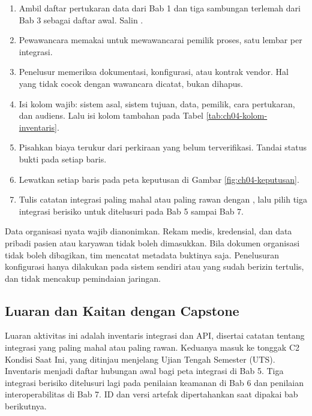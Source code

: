 \begin{enumerate}
  \item Ambil daftar pertukaran data dari Bab 1 dan tiga sambungan terlemah dari Bab 3 sebagai daftar awal.
        Salin .
  \item Pewawancara memakai  untuk mewawancarai
        pemilik proses, satu lembar per integrasi.
  \item Penelusur memeriksa dokumentasi, konfigurasi, atau kontrak vendor. Hal yang tidak cocok dengan wawancara
        dicatat, bukan dihapus.
  \item Isi kolom wajib: sistem asal, sistem tujuan, data, pemilik, cara pertukaran, dan audiens. Lalu isi kolom
        tambahan pada Tabel \ref{tab:ch04-kolom-inventaris}.
  \item Pisahkan biaya terukur dari perkiraan yang belum terverifikasi. Tandai status bukti pada setiap baris.
  \item Lewatkan setiap baris pada peta keputusan di Gambar \ref{fig:ch04-keputusan}.
  \item Tulis catatan integrasi paling mahal atau paling rawan dengan
        , lalu pilih tiga integrasi berisiko untuk ditelusuri
        pada Bab 5 sampai Bab 7.
\end{enumerate}

Data organisasi nyata wajib dianonimkan. Rekam medis, kredensial, dan data pribadi pasien atau karyawan tidak boleh
dimasukkan. Bila dokumen organisasi tidak boleh dibagikan, tim mencatat metadata buktinya saja. Penelusuran
konfigurasi hanya dilakukan pada sistem sendiri atau yang sudah berizin tertulis, dan tidak mencakup pemindaian
jaringan.

\subsection*{Luaran dan Kaitan dengan Capstone}

Luaran aktivitas ini adalah inventaris integrasi dan API, disertai catatan tentang integrasi yang paling mahal
atau paling rawan. Keduanya masuk ke tonggak C2 Kondisi Saat Ini, yang ditinjau menjelang Ujian Tengah Semester (UTS). Inventaris menjadi
daftar hubungan awal bagi peta integrasi di Bab 5. Tiga integrasi berisiko ditelusuri lagi pada penilaian keamanan
di Bab 6 dan penilaian interoperabilitas di Bab 7. ID dan versi artefak dipertahankan saat dipakai bab berikutnya.

